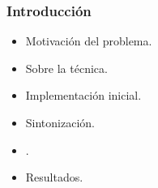 \frame
{
\frametitle{Introducción}
\begin{itemize}
	\item Motivación del problema.
	\item Sobre la técnica.
	\item Implementación inicial.
	\item Sintonización.
	\item {}.
	\item Resultados.
\end{itemize}
}

